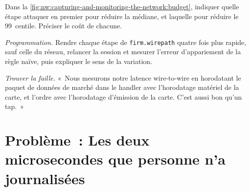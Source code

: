 \begin{exercise}[$\star\star$]\label{exo:nw:capturing-and-monitoring-the-network:6}
Dans la \cref{fig:nw:capturing-and-monitoring-the-network:budget}, indiquer quelle étape attaquer en premier pour réduire la médiane, et laquelle pour réduire le
99~centile. Préciser le coût de chacune.
\end{exercise}

\begin{exercise}[$\star\star\star$]\label{exo:nw:capturing-and-monitoring-the-network:7}
\emph{Programmation.} Rendre chaque étape de \texttt{firm.wirepath} quatre fois plus rapide, sauf celle du réseau, relancer la session et mesurer
l'erreur d'appariement de la règle naïve, puis expliquer le sens de la variation.
\end{exercise}

\begin{exercise}[$\star\star\star$]\label{exo:nw:capturing-and-monitoring-the-network:8}
\emph{Trouver la faille.} «~Nous mesurons notre latence wire-to-wire en horodatant le paquet de données de marché dans le handler avec
l'horodatage matériel de la carte, et l'ordre avec l'horodatage d'émission de la carte. C'est aussi bon qu'un tap.~»
\end{exercise}

\section{Problème~: Les deux microsecondes que personne n'a journalisées}

